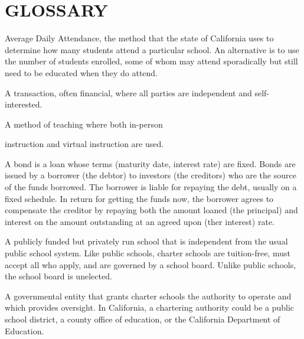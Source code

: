 
\chapter[Glossary]{\centering\normalfont\normalsize GLOSSARY}\label{ch:glossary}
\begin{description}[nosep]%

  \medskip\item[ADA] Average Daily Attendance, the method that the state of California uses to determine how many students attend a particular school. An alternative is to use the number of students enrolled, some of whom may attend sporadically but still need to be educated when they do attend. \parencite{SACS2019}

  \medskip\item[arm's length transaction] A transaction, often financial, where all parties are independent and self-interested. \parencite{Wex2024}

  \medskip\item[blended learning] A method of teaching where both in-person

  instruction and virtual instruction are used. \parencite{Graham2018}

  \medskip\item[bond] A bond is a loan whose terms (maturity date, interest rate) are fixed. Bonds are issued by a borrower (the debtor) to investors (the creditors) who are the source of the funds borrowed. The borrower is liable for repaying the debt, usually on a fixed schedule. In return for getting the funds now, the borrower agrees to compensate the creditor by repaying both the amount loaned (the principal) and interest on the amount outstanding at an agreed upon (ther interest) rate. \parencite{Borad2015}

  \medskip\item[charter school] A publicly funded but privately run school that is independent from the usual public school system. Like public schools, charter schools are tuition-free, must accept all who apply, and are governed by a school board. Unlike public schools, the school board is unelected. \parencite{CDE2023, CSBA2016, Eckes2024}

  \medskip\item[charter school authorizer] A governmental entity that grants charter schools the authority to operate and which provides oversight. In California, a chartering authority could be a public school district, a county office of education, or the California Department of Education. \parencite{NACSA2024}


\end{description}
